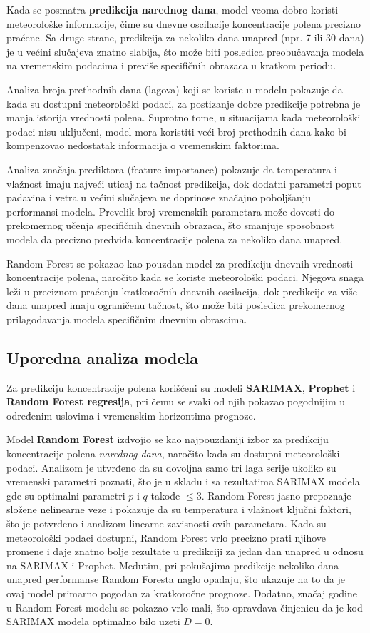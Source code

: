 \documentclass[12pt]{article}
\begin{document}
Kada se posmatra \textbf{predikcija narednog dana}, model veoma dobro koristi meteorološke informacije, čime su dnevne oscilacije koncentracije polena precizno praćene. Sa druge strane, predikcija za nekoliko dana unapred (npr. 7 ili 30 dana) je u većini slučajeva znatno slabija, što može biti posledica preobučavanja modela na vremenskim podacima i previše specifičnih obrazaca u kratkom periodu.

Analiza broja prethodnih dana (lagova) koji se koriste u modelu pokazuje da kada su dostupni meteorološki podaci, za postizanje dobre predikcije potrebna je manja istorija vrednosti polena. Suprotno tome, u situacijama kada meteorološki podaci nisu uključeni, model mora koristiti veći broj prethodnih dana kako bi kompenzovao nedostatak informacija o vremenskim faktorima.

Analiza značaja prediktora (feature importance) pokazuje da temperatura i vlažnost imaju najveći uticaj na tačnost predikcija, dok dodatni parametri poput padavina i vetra u većini slučajeva ne doprinose značajno poboljšanju performansi modela. Prevelik broj vremenskih parametara može dovesti do prekomernog učenja specifičnih dnevnih obrazaca, što smanjuje sposobnost modela da precizno predviđa koncentracije polena za nekoliko dana unapred.

Random Forest se pokazao kao pouzdan model za predikciju dnevnih vrednosti koncentracije polena, naročito kada se koriste meteorološki podaci. Njegova snaga leži u preciznom praćenju kratkoročnih dnevnih oscilacija, dok predikcije za više dana unapred imaju ograničenu tačnost, što može biti posledica prekomernog prilagođavanja modela specifičnim dnevnim obrascima.

\subsection{Uporedna analiza modela}

Za predikciju koncentracije polena korišćeni su modeli \textbf{SARIMAX}, \textbf{Prophet} i \textbf{Random Forest regresija}, pri čemu se svaki od njih pokazao pogodnijim u određenim uslovima i vremenskim horizontima prognoze.

Model \textbf{Random Forest} izdvojio se kao najpouzdaniji izbor za predikciju koncentracije polena \textit{narednog dana}, naročito kada su dostupni meteorološki podaci. Analizom je utvrđeno da su dovoljna samo tri laga serije ukoliko su vremenski parametri poznati, što je u skladu i sa rezultatima SARIMAX modela gde su optimalni parametri $p$ i $q$ takođe $\leq 3$. Random Forest jasno prepoznaje složene nelinearne veze i pokazuje da su temperatura i vlažnost ključni faktori, što je potvrđeno i analizom linearne zavisnosti ovih parametara. Kada su meteorološki podaci dostupni, Random Forest vrlo precizno prati njihove promene i daje znatno bolje rezultate u predikciji za jedan dan unapred u odnosu na SARIMAX i Prophet. Međutim, pri pokušajima predikcije nekoliko dana unapred performanse Random Foresta naglo opadaju, što ukazuje na to da je ovaj model primarno pogodan za kratkoročne prognoze.
Dodatno, značaj godine u Random Forest modelu se pokazao vrlo mali, što opravdava činjenicu da je kod SARIMAX modela optimalno bilo uzeti $D = 0$.
\end{document}

